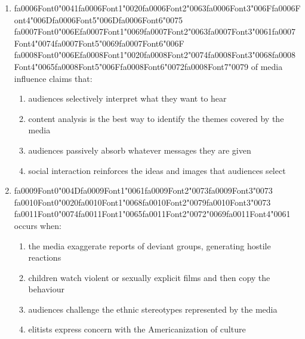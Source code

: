 \documentclass[12pt]{article}
\begin{document}
\begin{enumerate}[label=\arabic*.]
\item {\csname fa0006Font0\endcsname\char"0041}{\csname fa0006Font1\endcsname\char"0020}{\csname fa0006Font2\endcsname\char"0063}{\csname fa0006Font3\endcsname\char"006F}{\csname fa0006Font4\endcsname\char"006D}{\csname fa0006Font5\endcsname\char"006D}{\csname fa0006Font6\endcsname\char"0075} {\csname fa0007Font0\endcsname\char"006E}{\csname fa0007Font1\endcsname\char"0069}{\csname fa0007Font2\endcsname\char"0063}{\csname fa0007Font3\endcsname\char"0061}{\csname fa0007Font4\endcsname\char"0074}{\csname fa0007Font5\endcsname\char"0069}{\csname fa0007Font6\endcsname\char"006F} {\csname fa0008Font0\endcsname\char"006E}{\csname fa0008Font1\endcsname\char"0020}{\csname fa0008Font2\endcsname\char"0074}{\csname fa0008Font3\endcsname\char"0068}{\csname fa0008Font4\endcsname\char"0065}{\csname fa0008Font5\endcsname\char"006F}{\csname fa0008Font6\endcsname\char"0072}{\csname fa0008Font7\endcsname\char"0079} of media influence claims that:
\begin{enumerate}[label=(\alph*)]
    \item audiences selectively interpret what they want to hear
    \item content analysis is the best way to identify the themes covered by the media
    \item audiences passively absorb whatever messages they are given
    \item social interaction reinforces the ideas and images that audiences select
\end{enumerate}
\item {\csname fa0009Font0\endcsname\char"004D}{\csname fa0009Font1\endcsname\char"0061}{\csname fa0009Font2\endcsname\char"0073}{\csname fa0009Font3\endcsname\char"0073} {\csname fa0010Font0\endcsname\char"0020}{\csname fa0010Font1\endcsname\char"0068}{\csname fa0010Font2\endcsname\char"0079}{\csname fa0010Font3\endcsname\char"0073} {\csname fa0011Font0\endcsname\char"0074}{\csname fa0011Font1\endcsname\char"0065}{\csname fa0011Font2\endcsname\char"0072}{\char"0069}{\csname fa0011Font4\endcsname\char"0061} occurs when:
\begin{enumerate}[label=(\alph*)]
    \item the media exaggerate reports of deviant groups, generating hostile reactions
    \item children watch violent or sexually explicit films and then copy the behaviour
    \item audiences challenge the ethnic stereotypes represented by the media
    \item elitists express concern with the Americanization of culture

\end{enumerate}
\end{enumerate}
\end{document}
